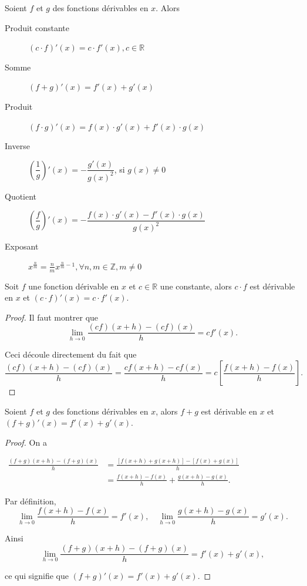 \documentclass[a4paper,12pt]{article}
\begin{document}
\begin{formules}
	\tcblower
	Soient $f$ et $g$ des fonctions dérivables en $x$. Alors
\begin{description}
	\item[Produit constante] $(c\cdot f)'(x)=c\cdot f'(x), c\in \mathbb{R}$
	\item[Somme]  $(f+g)'(x)=f'(x)+g'(x)$
	\item[Produit] $(f\cdot g)'(x)=f(x)\cdot g'(x)+f'(x)\cdot g(x)$
	\item[Inverse] $\left(\dfrac{1}{g}\right)'(x)=-\dfrac{g'(x)}{g(x)^2}$, si $g(x)\neq 0$
	\item[Quotient] $\left(\dfrac{f}{g}\right)'(x)=-\dfrac{f(x)\cdot g'(x)-f'(x)\cdot g(x)}{g(x)^2}$
	\item[Exposant] $x^{\frac{n}{m}}=\frac{n}{m}x^{\frac{n}{m}-1}, \forall n,m\in \mathbb{Z}, m\neq 0$
\end{description}
\end{formules}
\begin{prop}
   \tcblower
   Soit $f$ une fonction dérivable en $x$ et $c\in \mathbb{R}$ une constante, alors $c\cdot f$ est dérivable en $x$ et $(c\cdot f)'(x)=c\cdot f'(x)$.
   \medskip

   \begin{proof}
   	Il faut montrer que 
   	$$\lim_{h \to 0} \frac{(cf)(x+h) - (cf)(x)}{h} = cf'(x).$$
   	
   	Ceci découle directement du fait que
   	$$\frac{(cf)(x+h) - (cf)(x)}{h} = \frac{cf(x+h) - cf(x)}{h} = c\left[\frac{f(x+h) - f(x)}{h}\right].$$
   \end{proof}
\end{prop}

\begin{prop}
   \tcblower
   Soient $f$ et $g$ des fonctions dérivables en $x$, alors $f+g$ est dérivable en $x$ et $(f+g)'(x)=f'(x)+g'(x)$. 
   \medskip

   \begin{proof}
   On a 	

\medskip
   	$
	\begin{aligned}
		\frac{(f+g)(x+h) - (f+g)(x)}{h} &= \frac{[f(x+h) + g(x+h)] - [f(x) + g(x)]}{h}\\
	&= \frac{f(x+h) - f(x)}{h} + \frac{g(x+h) - g(x)}{h}.
\end{aligned}$
   	
   	Par définition,
   	$$\lim_{h \to 0} \frac{f(x+h) - f(x)}{h} = f'(x), \quad \lim_{h \to 0} \frac{g(x+h) - g(x)}{h} = g'(x).$$
   	
   	Ainsi
   	$$\lim_{h \to 0} \frac{(f+g)(x+h) - (f+g)(x)}{h} = f'(x) + g'(x),$$
   	
   	ce qui signifie que $(f+g)'(x) = f'(x) + g'(x)$.
   \end{proof}
\end{prop}
\end{document}
